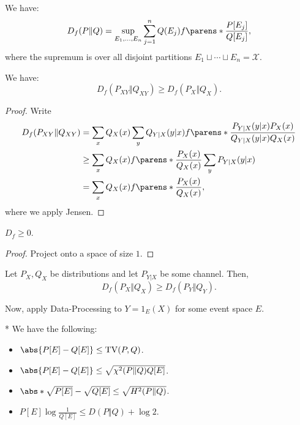 \begin{thm}
	We have: \[
		D_f(P\Vert Q) = \sup\limits_{E_1, \ldots, E_n} \sum_{j=1}^n Q(E_j) f \parens*{\frac{P[E_j]}{Q[E_j]}},
	\]
	where the supremum is over all disjoint partitions $E_1\sqcup \cdots \sqcup E_n = \mathcal X$.
\end{thm}

\begin{thm}
	[Monotonicity]
	We have: \[
		D_f(P_{XY} \Vert Q_{XY}) \geq D_f (P_X \Vert Q_X).
	\]	
\end{thm}

\begin{proof}
	Write \begin{align*}
		D_f(P_{XY} \Vert Q_{XY}) &= \sum_x Q_X(x)\sum_y Q_{Y|X} (y|x) f\parens*{\frac{P_{Y|X}(y|x) P_X(x)}{Q_{Y|X}(y|x) Q_X(x)}} \\
		&\geq \sum_x Q_X(x) f\parens*{\frac{P_X(x)}{Q_X(x)} \sum_y P_{Y|X}(y|x)}\\
		&= \sum_x Q_X(x) f\parens*{\frac{P_X(x)}{Q_X(x)}},
	\end{align*}
	where we apply Jensen.
\end{proof}

\begin{cor}
	$D_f\geq 0$.
\end{cor}

\begin{proof}
	Project onto a space of size $1$.
\end{proof}

\begin{cor}
	Let $P_X, Q_X$ be distributions and let $P_{Y|X}$ be some channel. Then, \[
		D_f(P_X\Vert Q_X) \geq D_f(P_Y\Vert Q_Y).
	\]
\end{cor}

Now, apply Data-Processing to $Y = 1_E(X)$ for some event space $E$. 

\begin{cor}*
	We have the following:
	\begin{itemize}
		\item $\abs{P[E] - Q[E]} \leq \operatorname{TV}(P,Q)$.
		\item $\abs{P[E] - Q[E]} \leq \sqrt{\chi^2(P\Vert Q) Q[E]}$.
		\item $\abs*{\sqrt{P[E]} - \sqrt{Q[E]}} \leq \sqrt{H^2(P\Vert Q)}$.
		\item $P[E] \log \frac{1}{Q[E]} \leq D(P\Vert Q) + \log 2$.
	\end{itemize}
\end{cor}


